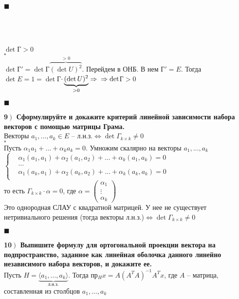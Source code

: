 \documentclass[a4paper,12pt]{article}
\begin{document}
\begin{flushright}
	$\blacksquare$
\end{flushright}
\textbf{}\\\\\\
$\det$Г$>0$\\
$\square$\\
$\det$Г$'=\det$Г$\overbrace{(\det U)^2}^{>0}$. Перейдем в ОНБ. В нем Г$'=E$. Тогда $\det E=1=\det$Г$\cdot\underbrace{(\det U)^2}_{>0}\Rightarrow\\\Rightarrow\det$Г$>0$
\begin{flushright}
	$\blacksquare$
\end{flushright}
\textbf{9$\left.\right)$ Сформулируйте и докажите критерий линейной зависимости набора векторов с помощью матрицы Грама.}\\
Векторы $a_1, \ldots, a_k\in E$ -- л.н.з.$\Leftrightarrow\det\Gamma_{k\times k}\ne0$\\
$\square$\\
Пусть $\alpha_1a_1+\ldots+\alpha_ka_k=0$. Умножим скалярно на векторы $a_1, \ldots, a_k$\\
$\left\lbrace \begin{aligned}
&\alpha_1(a_1, a_1)+\alpha_2(a_1, a_2)+\ldots+\alpha_k(a_1, a_k)=0\\
&\ldots\\
&\alpha_1(a_k, a_1)+\alpha_2(a_k, a_2)+\ldots+\alpha_k(a_k, a_k)=0\\
\end{aligned}\right.$\\
то есть $\Gamma_{k\times k}\cdot\alpha=0$, где $\alpha=\begin{pmatrix}
\alpha_1\\
\vdots\\
\alpha_k
\end{pmatrix}$\\
Это однородная СЛАУ с квадратной матрицей. У нее не существует нетривиального решения (тогда векторы л.н.з.)$\Leftrightarrow\det\Gamma_{k\times k}\ne0$
\begin{flushright}
	$\blacksquare$
\end{flushright}
\textbf{10$\left.\right)$ Выпишите формулу для ортогональной проекции вектора на подпространство, заданное как линейная оболочка данного линейно независимого набора векторов, и докажите ее.}\\
Пусть $H=\underbrace{\langle a_1, \ldots, a_k \rangle}_{\text{л.н.з.}}$. Тогда пр$_Hx=A(A^TA)^{-1}A^Tx$, где $A$ -- матрица, составленная из столбцов $a_1, \ldots, a_k$\\
\end{document}
